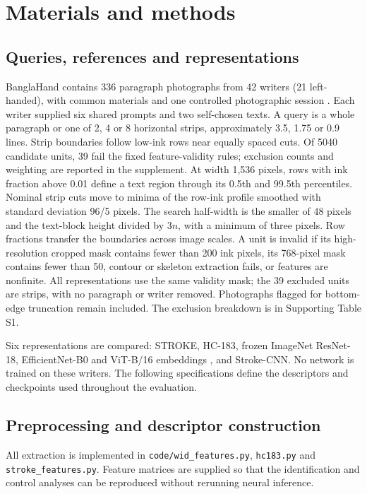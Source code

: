 \documentclass[ASNA,twocolumn]{USG}
\begin{document}
\section{Materials and methods}
\label{sec:protocol}
\subsection{Queries, references and representations}
BanglaHand contains 336 paragraph photographs from 42 writers (21 left-handed), with common materials and one controlled photographic session \cite{banglahand2026data}. Each writer supplied six shared prompts and two self-chosen texts. A query is a whole paragraph or one of 2, 4 or 8 horizontal strips, approximately 3.5, 1.75 or 0.9 lines. Strip boundaries follow low-ink rows near equally spaced cuts. Of 5040 candidate units, 39 fail the fixed feature-validity rules; exclusion counts and weighting are reported in the supplement. At width 1,536 pixels, rows with ink fraction above 0.01 define a text region through its 0.5th and 99.5th percentiles. Nominal strip cuts move to minima of the row-ink profile smoothed with standard deviation 96/5 pixels. The search half-width is the smaller of 48 pixels and the text-block height divided by $3n$, with a minimum of three pixels. Row fractions transfer the boundaries across image scales. A unit is invalid if its high-resolution cropped mask contains fewer than 200 ink pixels, its 768-pixel mask contains fewer than 50, contour or skeleton extraction fails, or features are nonfinite. All representations use the same validity mask; the 39 excluded units are strips, with no paragraph or writer removed. Photographs flagged for bottom-edge truncation remain included. The exclusion breakdown is in Supporting Table S1.

Six representations are compared: STROKE, HC-183, frozen ImageNet ResNet-18, EfficientNet-B0 and ViT-B/16 embeddings \cite{he2016resnet,tan2019efficientnet,dosovitskiy2021vit}, and Stroke-CNN. No network is trained on these writers. The following specifications define the descriptors and checkpoints used throughout the evaluation.

\subsection{Preprocessing and descriptor construction}
All extraction is implemented in \texttt{code/wid\_features.py}, \texttt{hc183.py} and \texttt{stroke\_features.py}. Feature matrices are supplied so that the identification and control analyses can be reproduced without rerunning neural inference.
\end{document}
